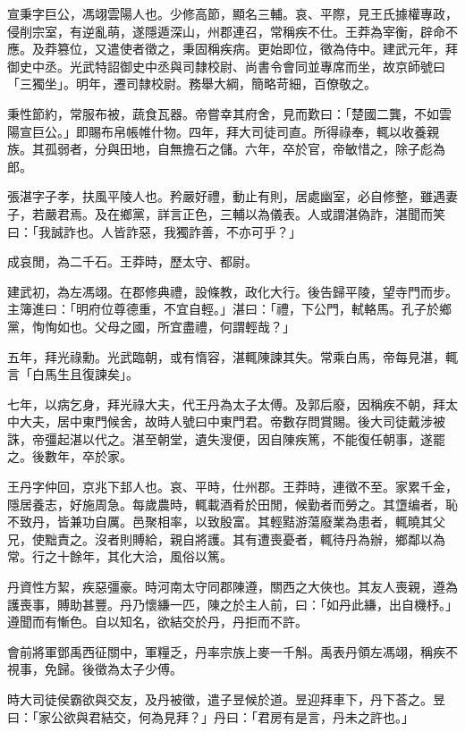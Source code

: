
\begin{pinyinscope}
宣秉字巨公，馮翊雲陽人也。少修高節，顯名三輔。哀、平際，見王氏據權專政，侵削宗室，有逆亂萌，遂隱遁深山，州郡連召，常稱疾不仕。王莽為宰衡，辟命不應。及莽篡位，又遣使者徵之，秉固稱疾病。更始即位，徵為侍中。建武元年，拜御史中丞。光武特詔御史中丞與司隸校尉、尚書令會同並專席而坐，故京師號曰「三獨坐」。明年，遷司隸校尉。務舉大綱，簡略苛細，百僚敬之。

秉性節約，常服布被，蔬食瓦器。帝嘗幸其府舍，見而歎曰：「楚國二龔，不如雲陽宣巨公。」即賜布帛帳帷什物。四年，拜大司徒司直。所得祿奉，輒以收養親族。其孤弱者，分與田地，自無擔石之儲。六年，卒於官，帝敏惜之，除子彪為郎。

張湛字子孝，扶風平陵人也。矜嚴好禮，動止有則，居處幽室，必自修整，雖遇妻子，若嚴君焉。及在鄉黨，詳言正色，三輔以為儀表。人或謂湛偽詐，湛聞而笑曰：「我誠詐也。人皆詐惡，我獨詐善，不亦可乎？」

成哀閒，為二千石。王莽時，歷太守、都尉。

建武初，為左馮翊。在郡修典禮，設條教，政化大行。後告歸平陵，望寺門而步。主簿進曰：「明府位尊德重，不宜自輕。」湛曰：「禮，下公門，軾輅馬。孔子於鄉黨，恂恂如也。父母之國，所宜盡禮，何謂輕哉？」

五年，拜光祿勳。光武臨朝，或有惰容，湛輒陳諫其失。常乘白馬，帝每見湛，輒言「白馬生且復諫矣」。

七年，以病乞身，拜光祿大夫，代王丹為太子太傅。及郭后廢，因稱疾不朝，拜太中大夫，居中東門候舍，故時人號曰中東門君。帝數存問賞賜。後大司徒戴涉被誅，帝彊起湛以代之。湛至朝堂，遺失溲便，因自陳疾篤，不能復任朝事，遂罷之。後數年，卒於家。

王丹字仲回，京兆下邽人也。哀、平時，仕州郡。王莽時，連徵不至。家累千金，隱居養志，好施周急。每歲農時，輒載酒肴於田閒，候勤者而勞之。其墯编者，恥不致丹，皆兼功自厲。邑聚相率，以致殷富。其輕黠游蕩廢業為患者，輒曉其父兄，使黜責之。沒者則賻給，親自將護。其有遭喪憂者，輒待丹為辦，鄉鄰以為常。行之十餘年，其化大洽，風俗以篤。

丹資性方絜，疾惡彊豪。時河南太守同郡陳遵，關西之大俠也。其友人喪親，遵為護喪事，賻助甚豐。丹乃懷縑一匹，陳之於主人前，曰：「如丹此縑，出自機杼。」遵聞而有慚色。自以知名，欲結交於丹，丹拒而不許。

會前將軍鄧禹西征關中，軍糧乏，丹率宗族上麥一千斛。禹表丹領左馮翊，稱疾不視事，免歸。後徵為太子少傅。

時大司徒侯霸欲與交友，及丹被徵，遣子昱候於道。昱迎拜車下，丹下荅之。昱曰：「家公欲與君結交，何為見拜？」丹曰：「君房有是言，丹未之許也。」


\end{pinyinscope}
